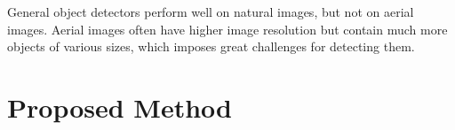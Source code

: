 \documentclass[letterpaper]{article} %
\def \eg {\emph{e.g.}}
\def \ie {\emph{i.e.}}
\newcommand\rjf[1]{\textcolor{red}{\{RJF: #1\}}}
\begin{document}
General object detectors perform well on natural images, %
but not on aerial images. Aerial images often have higher image resolution but contain much more objects of various sizes, which imposes great challenges for detecting them. %



\section{Proposed Method}
\label{sec: methodology}




\end{document}
